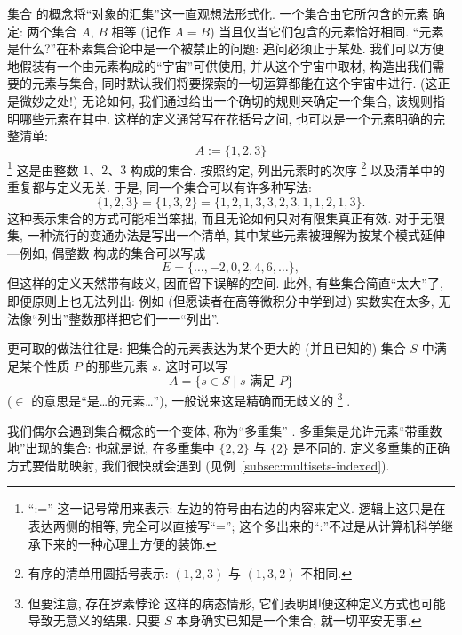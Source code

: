 集合%
的概念将``对象的汇集''这一直观想法形式化. 一个集合由它所包含的元素%
确定: 两个集合 $A$, $B$ 相等 (记作 $A = B$) 当且仅当它们包含的元素恰好相同. ``元素是什么?''在朴素集合论中是一个被禁止的问题: 追问必须止于某处. 我们可以方便地假装有一个由元素构成的``宇宙''可供使用, 并从这个宇宙中取材, 构造出我们需要的元素与集合, 同时默认我们将要探索的一切运算都能在这个宇宙中进行. (这正是微妙之处!) 无论如何, 我们通过给出一个确切的规则来确定一个集合, 该规则指明哪些元素在其中. 这样的定义通常写在花括号之间, 也可以是一个元素明确的完整清单:
\[
	A := \{1,2,3\}
\]
\footnote{``:='' 这一记号常用来表示: 左边的符号由右边的内容来定义. 逻辑上这只是在表达两侧的相等, 完全可以直接写``=''; 这个多出来的``:''不过是从计算机科学继承下来的一种心理上方便的装饰.}%
这是由整数 $1$、$2$、$3$ 构成的集合. 按照约定, 列出元素时的次序%
\footnote{有序的清单用圆括号表示: $(1,2,3)$ 与 $(1,3,2)$ 不相同.}%
以及清单中的重复都与定义无关. 于是, 同一个集合可以有许多种写法:
\[
	\{1,2,3\} = \{1,3,2\} = \{1,2,1,3,3,2,3,1,1,2,1,3\}.
\]
这种表示集合的方式可能相当笨拙, 而且无论如何只对有限集真正有效. 对于无限集, 一种流行的变通办法是写出一个清单, 其中某些元素被理解为按某个模式延伸---例如, 偶整数%
构成的集合可以写成
\[
	E = \{\dots, -2, 0, 2, 4, 6, \dots\},
\]
但这样的定义天然带有歧义, 因而留下误解的空间. 此外, 有些集合简直``太大''了, 即便原则上也无法列出: 例如 (但愿读者在高等微积分中学到过) 实数实在太多, 无法像``列出''整数那样把它们一一``列出''.

更可取的做法往往是: 把集合的元素表达为某个更大的 (并且已知的) 集合 $S$ 中满足某个性质 $P$ 的那些元素 $s$. 这时可以写
\[
	A = \{s \in S \mid s \text{ 满足 } P\}
\]
($\in$ 的意思是``是\ldots 的元素\ldots''), 一般说来这是精确而无歧义的%
\footnote{但要注意, 存在罗素悖论%
这样的病态情形, 它们表明即便这种定义方式也可能导致无意义的结果. 只要 $S$ 本身确实已知是一个集合, 就一切平安无事.}%
.

我们偶尔会遇到集合概念的一个变体, 称为``多重集''%
. 多重集是允许元素``带重数地''出现的集合: 也就是说, 在多重集中 $\{2,2\}$ 与 $\{2\}$ 是不同的. 定义多重集的正确方式要借助映射, 我们很快就会遇到 (见例~\ref{subsec:multisets-indexed}).

